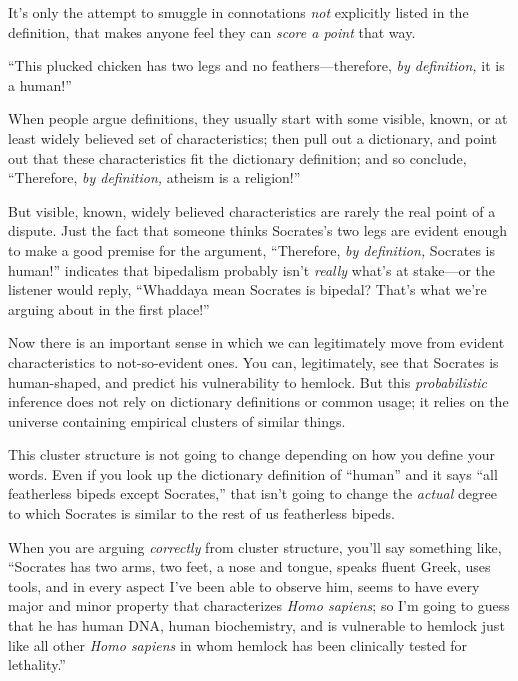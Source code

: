 {
 It's only the attempt to smuggle in connotations
\textit{not} explicitly listed in the definition, that makes anyone
feel they can \textit{score a point} that way.}

\myendsectiontext


{
 ``This plucked chicken has two legs and no
feathers---therefore, \textit{by definition,} it is a
human!'' }

{
 When people argue definitions, they usually start with some
visible, known, or at least widely believed set of characteristics;
then pull out a dictionary, and point out that these characteristics
fit the dictionary definition; and so conclude,
``Therefore, \textit{by definition,} atheism is a
religion!''}

{
 But visible, known, widely believed characteristics are rarely the
real point of a dispute. Just the fact that someone thinks
Socrates's two legs are evident enough to make a good
premise for the argument, ``Therefore, \textit{by
definition,} Socrates is human!'' indicates that
bipedalism probably isn't \textit{really}
what's at stake---or the listener would reply,
``Whaddaya mean Socrates is bipedal?
That's what we're arguing about in the
first place!''}

{
 Now there is an important sense in which we can legitimately move
from evident characteristics to not-so-evident ones. You can,
legitimately, see that Socrates is human-shaped, and predict his
vulnerability to hemlock. But this \textit{probabilistic} inference
does not rely on dictionary definitions or common usage; it relies on
the universe containing empirical clusters of similar things.}

{
 This cluster structure is not going to change depending on how you
define your words. Even if you look up the dictionary definition of
``human'' and it says
``all featherless bipeds except
Socrates,'' that isn't going to
change the \textit{actual} degree to which Socrates is similar to the
rest of us featherless bipeds.}

{
 When you are arguing \textit{correctly} from cluster structure,
you'll say something like, ``Socrates
has two arms, two feet, a nose and tongue, speaks fluent Greek, uses
tools, and in every aspect I've been able to observe
him, seems to have every major and minor property that characterizes
\textit{Homo sapiens}; so I'm going to guess that he
has human DNA, human biochemistry, and is vulnerable to hemlock just
like all other \textit{Homo sapiens} in whom hemlock has been
clinically tested for lethality.''}

